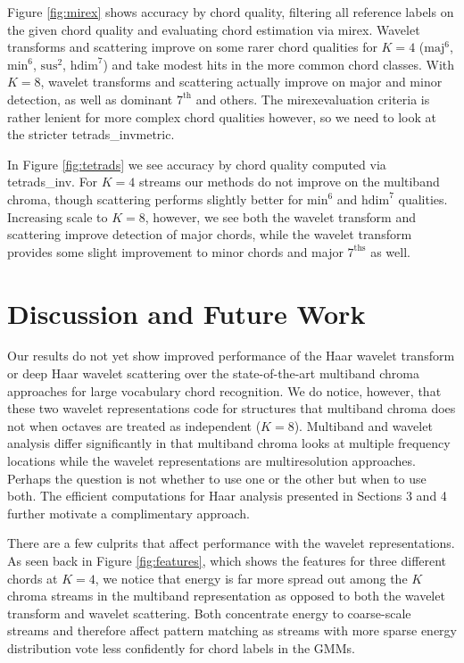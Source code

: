 \documentclass{article}
\newcommand{\mirex}{mirex}
\newcommand{\tetradsinv}{tetrads\_inv}
\begin{document}
Figure \ref{fig:mirex} shows accuracy by chord quality, filtering all reference labels on the given chord quality and evaluating chord estimation via \mirex. Wavelet transforms and scattering improve on some rarer chord qualities for $K=4$
($\textrm{maj}^\textrm{6}$, $\textrm{min}^\textrm{6}$,
$\textrm{sus}^\textrm{2}$, $\textrm{hdim}^\textrm{7}$)
and take modest hits in the more common chord classes. With $K=8$, wavelet transforms and scattering actually improve on major and minor detection, as well as dominant $\textrm{7}^\textrm{th}$ and others. The \mirex evaluation criteria is rather lenient for more complex chord qualities however, so we need to look at the stricter \tetradsinv metric.

In Figure \ref{fig:tetrads} we see accuracy by chord quality computed via \tetradsinv.
For $K=4$ streams our methods do not improve on the multiband chroma,
though scattering performs slightly better for $\textrm{min}^\textrm{6}$ and $\textrm{hdim}^\textrm{7}$ qualities. Increasing scale to $K=8$, however, we see both the wavelet transform and scattering improve detection of major chords, while the wavelet transform provides some slight improvement to minor chords and major $\textrm{7}^\textrm{ths}$ as well. 
	

\section{Discussion and Future Work}\label{sec:conclusion}

Our results do not yet show improved performance of the Haar wavelet transform or deep Haar wavelet scattering over the state-of-the-art multiband chroma approaches for large vocabulary chord recognition. We do notice, however, that these two wavelet representations code for structures that multiband chroma does not when octaves are treated as independent ($K=8$). Multiband and wavelet analysis differ significantly in that multiband chroma looks at multiple frequency locations while the wavelet representations are multiresolution approaches. Perhaps the question is not whether to use one or the other but when to use both. The efficient computations for Haar analysis presented in Sections 3 and 4 further motivate a complimentary approach.

There are a few culprits that affect performance with the wavelet representations. As seen back in Figure \ref{fig:features}, which shows the features for three different chords at $K=4$, we notice that energy is far more spread out among the $K$ chroma streams in the multiband representation as opposed to both the wavelet transform and wavelet scattering. Both concentrate energy to coarse-scale streams and therefore affect pattern matching as streams with more sparse energy distribution vote less confidently for chord labels in the GMMs.
\end{document}
